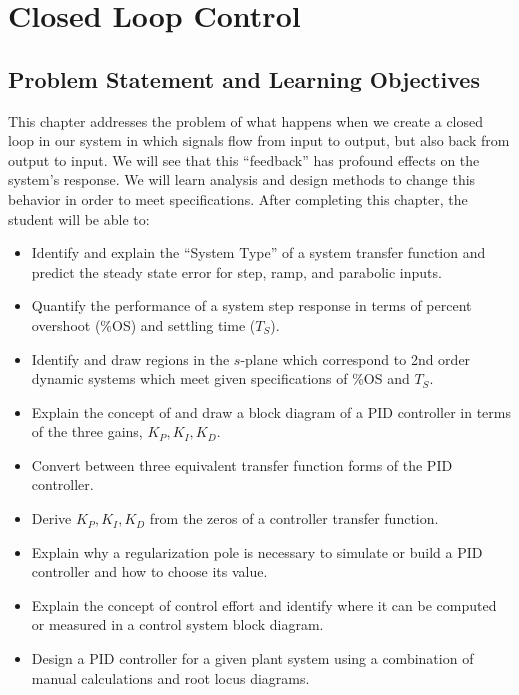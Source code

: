 %
%
%

\chapter{Closed Loop Control}

\section{Problem Statement and Learning Objectives}


This chapter addresses the problem of what happens when we create a closed loop in our system in which signals flow from input to output, but also back from output to input.  We will see that this ``feedback'' has profound effects on the system's response.  We will learn analysis and design methods to change this behavior in order to meet specifications.  After completing this chapter, the student will be able to:

\begin{itemize}

  \item Identify and explain the ``System Type'' of a system transfer function and predict the steady state error for step, ramp, and parabolic inputs.

  \item Quantify the performance of a system step response in terms of percent overshoot (\%OS) and settling time ($T_S$).

  \item Identify and draw regions in the $s$-plane which correspond to 2nd order dynamic systems which meet given specifications of \%OS and $T_S$.

  \item Explain the concept of and draw a block diagram of a PID controller in terms of the three gains, $K_P, K_I, K_D$.

  \item Convert between three equivalent transfer function forms of the PID controller.

  \item Derive $K_P, K_I, K_D$ from the zeros of a controller transfer function.

  \item Explain why a regularization pole is necessary to simulate or build a PID controller and how to choose its value.

  \item Explain the concept of control effort and identify where it can be computed or measured in a control system block diagram.

  \item Design a PID controller for a given plant system using a combination of manual calculations and  root locus diagrams.


\end{itemize}




